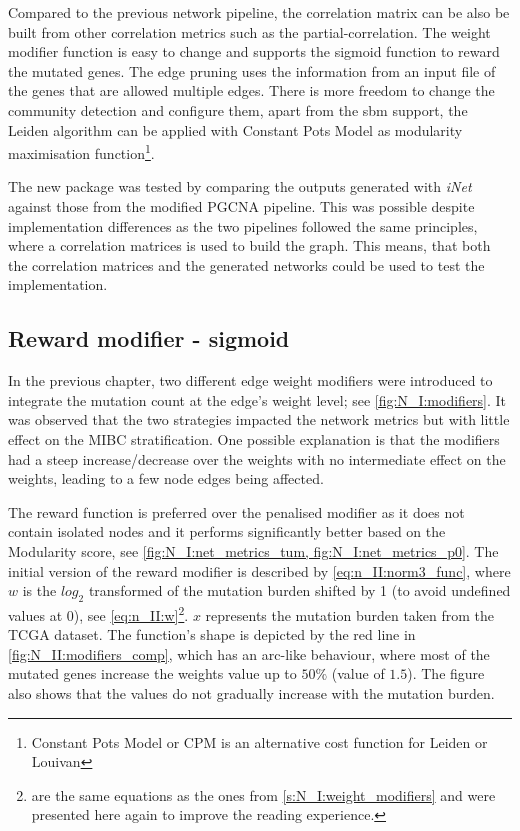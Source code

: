 Compared to the previous network pipeline, the correlation matrix can be also be built from other correlation metrics such as the partial-correlation. The weight modifier function is easy to change and supports the sigmoid function to reward the mutated genes. The edge pruning uses the information from an input file of the genes that are allowed multiple edges. There is more freedom to change the community detection and configure them, apart from the \acrfull{sbm} support, the Leiden algorithm can be applied with Constant Pots Model as modularity maximisation function\footnote{Constant Pots Model or CPM is an alternative cost function for Leiden or Louivan}.

The new package was tested by comparing the outputs generated with \textit{iNet} against those from the modified PGCNA pipeline. This was possible despite implementation differences as the two pipelines followed the same principles, where a correlation matrices is used to build the graph. This means, that both the correlation matrices and the generated networks could be used to test the implementation.

\subsection*{Reward modifier - sigmoid} \label{s:N_II:reward}

In the previous chapter, two different edge weight modifiers were introduced to integrate the mutation count at the edge's weight level; see \cref{fig:N_I:modifiers}. It was observed that the two strategies impacted the network metrics but with little effect on the MIBC stratification. One possible explanation is that the modifiers had a steep increase/decrease over the weights with no intermediate effect on the weights, leading to a few node edges being affected. 

The reward function is preferred over the penalised modifier as it does not contain isolated nodes and it performs significantly better based on the Modularity score, see \cref{fig:N_I:net_metrics_tum, fig:N_I:net_metrics_p0}. The initial version of the reward modifier is described by \cref{eq:n_II:norm3_func}, where $w$ is the $log_2$ transformed of the mutation burden shifted by 1 (to avoid undefined values at 0), see \cref{eq:n_II:w}\footnote{ are the same equations as the ones from \cref{s:N_I:weight_modifiers} and were presented here again to improve the reading experience.}. $x$ represents the mutation burden taken from the TCGA dataset. The function's shape is depicted by the red line in \cref{fig:N_II:modifiers_comp}, which has an arc-like behaviour, where most of the mutated genes increase the weights value up to $50\%$ (value of $1.5$). The figure also shows that the values do not gradually increase with the mutation burden.

